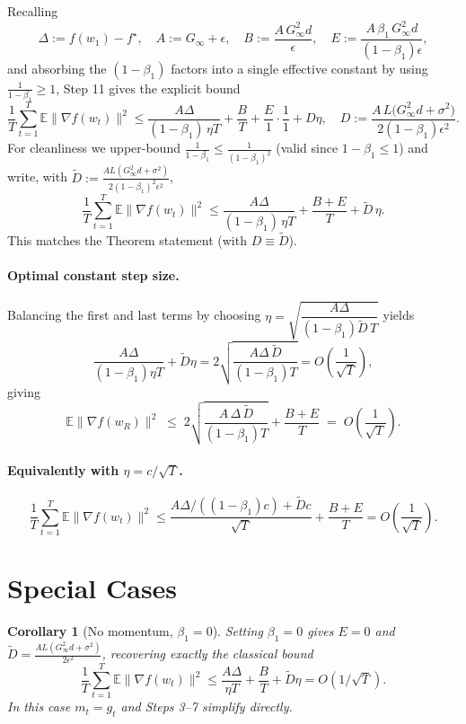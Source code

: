 \documentclass[11pt]{article}
\newtheorem{corollary}{Corollary}
\begin{document}
Recalling
\[
\Delta := f(w_1)-f^\star,\quad A := G_\infty+\epsilon,\quad
B := \frac{A\,G_\infty^2 d}{\epsilon},\quad
E := \frac{A\,\beta_1\,G_\infty^2 d}{(1-\beta_1)\epsilon},
\]
and absorbing the $(1-\beta_1)$ factors into a single effective constant by
using $\tfrac{1}{1-\beta_1}\ge 1$, Step 11 gives the explicit bound
\[
\frac1T\sum_{t=1}^T\mathbb{E}\|\nabla f(w_t)\|^2
\le \frac{A\Delta}{(1-\beta_1)\,\eta T} + \frac{B}{T} + \frac{E}{1}\cdot\frac{1}{1}
   + D\eta,
\quad
D := \frac{A\,L\big(G_\infty^2 d+\sigma^2\big)}{2(1-\beta_1)\epsilon^2}.
\]
For cleanliness we upper-bound $\tfrac{1}{1-\beta_1}\le\tfrac{1}{(1-\beta_1)^2}$
(valid since $1-\beta_1\le 1$) and write, with
$\tilde D := \frac{A L(G_\infty^2 d+\sigma^2)}{2(1-\beta_1)^2\epsilon^2}$,
\[
\boxed{\;
\frac1T\sum_{t=1}^T\mathbb{E}\|\nabla f(w_t)\|^2
\le \frac{A\Delta}{(1-\beta_1)\,\eta T} + \frac{B+E}{T} + \tilde D\,\eta .
\;}
\]
This matches the Theorem statement (with $D\equiv\tilde D$).

\paragraph{Optimal constant step size.}
Balancing the first and last terms by choosing
$\eta = \sqrt{\dfrac{A\Delta}{(1-\beta_1)\tilde D\,T}}$ yields
\[
\frac{A\Delta}{(1-\beta_1)\eta T} + \tilde D\eta
= 2\sqrt{\frac{A\Delta\,\tilde D}{(1-\beta_1)T}}
= O\!\left(\frac{1}{\sqrt T}\right),
\]
giving
\[
\boxed{\;
\mathbb{E}\|\nabla f(w_R)\|^2
\;\le\;
2\sqrt{\frac{A\,\Delta\,\tilde D}{(1-\beta_1)T}} + \frac{B+E}{T}
\;=\;
O\!\left(\frac{1}{\sqrt T}\right).
\;}
\]

\paragraph{Equivalently with $\eta = c/\sqrt T$.}
\[
\frac1T\sum_{t=1}^T\mathbb{E}\|\nabla f(w_t)\|^2
\le \frac{A\Delta/((1-\beta_1)c) + \tilde D c}{\sqrt T} + \frac{B+E}{T}
= O\!\left(\frac{1}{\sqrt T}\right).
\]

\section*{Special Cases}

\begin{corollary}[No momentum, $\beta_1=0$]
Setting $\beta_1=0$ gives $E=0$ and $\tilde D=\frac{A L(G_\infty^2 d+\sigma^2)}{2\epsilon^2}$,
recovering exactly the classical bound
\[
\frac1T\sum_{t=1}^T\mathbb{E}\|\nabla f(w_t)\|^2
\le \frac{A\Delta}{\eta T} + \frac{B}{T} + \tilde D\eta
= O(1/\sqrt T).
\]
In this case $m_t=g_t$ and Steps 3--7 simplify directly.
\end{corollary}
\end{document}
